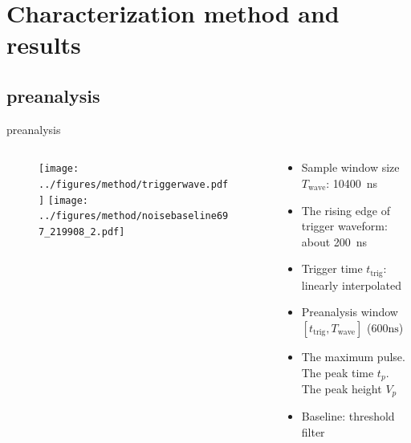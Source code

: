 \documentclass[aspectratio=169]{beamer}
\begin{document}
\section{Characterization method and results}
\subsection{preanalysis}
\begin{frame}{preanalysis}
    \begin{columns}
        \begin{column}{0.45\textwidth}
            \begin{figure}
                \texttt{[image: ../figures/method/triggerwave.pdf]}
                \texttt{[image: ../figures/method/noisebaseline697\_219908\_2.pdf]}
            \end{figure}
        \end{column}
        \begin{column}{0.55\textwidth}
            \begin{itemize}
                \item Sample window size $T_{\mathrm{wave}}$: \SI{10400}{ns}
                \item The rising edge of trigger waveform: about \SI{200}{ns}
                \item Trigger time $t_{\mathrm{trig}}$: linearly interpolated
                \item Preanalysis window $[t_{\mathrm{trig}},T_{\mathrm{wave}}]$ ($600\mathrm{ns}$)
            \end{itemize}

            \begin{itemize}
                \item The maximum pulse. The peak time $t_p$. The peak height $V_p$
                \item Baseline: threshold filter
            \end{itemize}
        \end{column}
    \end{columns}
\end{frame}
\end{document}

